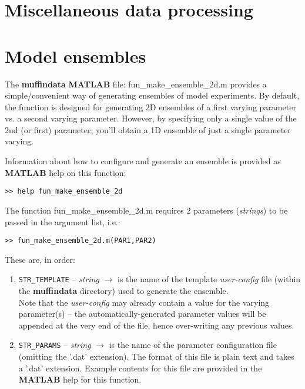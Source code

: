 \newpage

\section{Miscellaneous data processing}

\newpage

\section{Model ensembles}

The \textbf{muffindata} \textbf{MATLAB} file: \textsf{\footnotesize fun\_make\_ensemble\_2d.m} provides a simple/convenient way of generating ensembles of model experiments. By default, the function is designed for generating 2D ensembles of a first varying parameter vs. a second varying parameter. However, by specifying only a single value of the 2nd (or first) parameter, you'll obtain a 1D ensemble of just a single  parameter varying.

Information about how to configure and generate an ensemble is provided as \textbf{MATLAB} help on this function:
\vspace{-2mm}
\begin{verbatim}
>> help fun_make_ensemble_2d
\end{verbatim}
\vspace{-2mm}

The function \textsf{\footnotesize fun\_make\_ensemble\_2d.m} requires 2 parameters (\textit{strings}) to be passed in the argument list, i.e.:
\vspace{-1mm}\begin{verbatim}
>> fun_make_ensemble_2d.m(PAR1,PAR2)
\end{verbatim}\vspace{-1mm}
These are, in order:
\begin{enumerate}
\vspace{1mm}
\item \texttt{STR\_TEMPLATE} -- \textit{string} \(\rightarrow\) is the name of the template \textit{user-config} file (within the \textbf{muffindata} directory) used to generate the ensemble. 
\\Note that the \textit{user-config} may already contain a value for the varying parameter(s) -- the automatically-generated parameter values will be appended at the very end of the file, hence over-writing any previous values.
\vspace{1mm}
\item \texttt{STR\_PARAMS} -- \textit{string} \(\rightarrow\)  is the name of the parameter configuration file (omitting the '\textsf{\footnotesize .dat}' extension). The format of this file is plain text and takes a '\textsf{\footnotesize .dat}' extension. Example contents for this file are provided in the \textbf{MATLAB} help for this function.
\end{enumerate}
\vspace{2mm}

